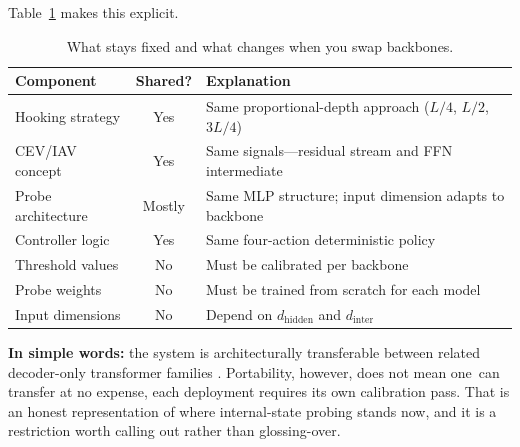 Table~\ref{tab:agnostic} makes this explicit.

\begin{table}[!htb]
\centering
\caption{What stays fixed and what changes when you swap backbones.}
\label{tab:agnostic}
\begin{tabular}{@{}lcp{7cm}@{}}
\toprule
\textbf{Component} & \textbf{Shared?} & \textbf{Explanation} \\
\midrule
Hooking strategy    & Yes   & Same proportional-depth approach ($L/4$, $L/2$, $3L/4$) \\
CEV/IAV concept     & Yes   & Same signals—residual stream and FFN intermediate \\
Probe architecture  & Mostly & Same MLP structure; input dimension adapts to backbone \\
Controller logic    & Yes   & Same four-action deterministic policy \\
Threshold values    & No    & Must be calibrated per backbone \\
Probe weights       & No    & Must be trained from scratch for each model \\
Input dimensions    & No    & Depend on $d_{\text{hidden}}$ and $d_{\text{inter}}$ \\
\bottomrule
\end{tabular}
\end{table}

\textbf{In simple words:} the system is architecturally transferable between related decoder-only transformer families . Portability, however, does not mean one can transfer at no expense, each deployment requires its own calibration pass. That is an honest representation of where internal-state probing stands now, and it is a restriction worth calling out rather than glossing-over.
